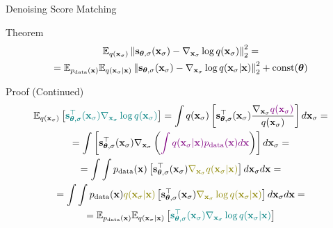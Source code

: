 \documentclass{beamer}
\renewcommand{\nextonslide}[1]{#1}
\begin{document}
\begin{frame}{Denoising Score Matching}
	\begin{block}{Theorem}
		\vspace{-0.5cm}
		\begin{multline*}
			\mathbb{E}_{q(\mathbf{x}_{\sigma})}\left\| \mathbf{s}_{\boldsymbol{\theta}, \sigma}(\mathbf{x}_{\sigma}) - \nabla_{\mathbf{x}_{\sigma}} \log q(\mathbf{x}_{\sigma}) \right\|_2^2 = \\
			= \mathbb{E}_{p_{\text{data}}(\mathbf{x})} \mathbb{E}_{q(\mathbf{x}_{\sigma} | \mathbf{x})}\left\| \mathbf{s}_{\boldsymbol{\theta}, \sigma}(\mathbf{x}_{\sigma}) - \nabla_{\mathbf{x}_{\sigma}} \log q(\mathbf{x}_{\sigma} | \mathbf{x}) \right\|_2^2 + \text{const}(\boldsymbol{\theta})
		\end{multline*}
		\vspace{-0.5cm}
	\end{block}
	\begin{block}{Proof (Continued)}
		\vspace{-0.7cm}
		{\small
		\begin{multline*}
			\bbE_{q(\bx_{\sigma})} \left[{\color{teal}\bs_{\btheta, \sigma}^\top(\bx_{\sigma}) \nabla_{\bx_{\sigma}} \log q(\bx_{\sigma})} \right] 
			\nextonslide{= \int q(\bx_{\sigma}) \left[\bs_{\btheta, \sigma}^\top(\bx_{\sigma}) \frac{\nabla_{\bx_{\sigma}} {\color{violet}q(\bx_{\sigma})}}{q(\bx_{\sigma})} \right] d\bx_{\sigma}}
			\nextonslide{= \\ = \int \left[\bs_{\btheta, \sigma}^\top(\bx_{\sigma}) \nabla_{\bx_{\sigma}}\left({\color{violet}\int q(\bx_{\sigma} | \bx) \pd(\bx) d\bx}\right) \right] d\bx_{\sigma}}
			\nextonslide{ = \\ =  \int \int \pd(\bx) \left[\bs_{\btheta, \sigma}^\top(\bx_{\sigma}) {\color{olive}\nabla_{\bx_{\sigma}}q(\bx_{\sigma} | \bx)} \right] d\bx_{\sigma} d\bx}
			\nextonslide{ = \\ = \int \int \pd(\bx) {\color{olive} q(\bx_{\sigma} | \bx)} \left[\bs_{\btheta, \sigma}^\top(\bx_{\sigma}) {\color{olive}\nabla_{\bx_{\sigma}} \log q(\bx_{\sigma} | \bx)} \right] d\bx_{\sigma} d\bx}
			\nextonslide{ = \\ = \bbE_{\pd(\bx)} \bbE_{q(\bx_{\sigma} | \bx)} \left[{\color{teal}\bs_{\btheta, \sigma}^\top(\bx_{\sigma}) \nabla_{\bx_{\sigma}} \log q(\bx_{\sigma} | \bx)} \right]}
		\end{multline*}
		}
	\end{block}
\end{frame}
\end{document}
